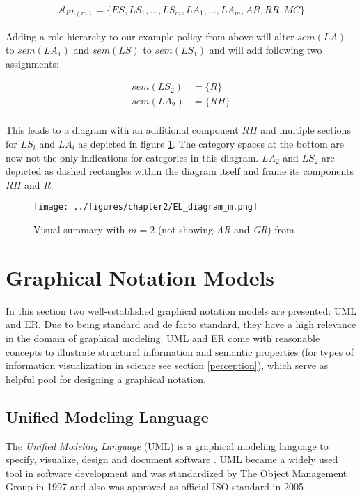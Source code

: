 \documentclass[twoside, openright, 12pt]{book}
\begin{document}
\begin{align*}
\mathcal{A}_{\mathit{EL}(m)} = \lbrace \mathit{ES}, \mathit{LS}_1, \dots, \mathit{LS}_m, \mathit{LA}_1, \dots, \mathit{LA}_m, \mathit{AR}, \mathit{RR}, \mathit{MC}\rbrace
\end{align*}

\noindent
Adding a role hierarchy to our example policy from above will alter $sem(\mathit{LA})$ to $sem(\mathit{LA}_1)$ and $sem(\mathit{LS})$ to $sem(\mathit{LS}_1)$ and will add following two assignments:

\begin{align*}
sem(\mathit{LS}_2) &= \lbrace R \rbrace\\
sem(\mathit{LA}_2) &= \lbrace \mathit{RH} \rbrace\\
\end{align*}

\noindent
This leads to a diagram with an additional component $RH$ and multiple sections for $\mathit{LS}_i$ and $\mathit{LA}_i$ as depicted in figure \ref{fig:EL_diagram_m}.
The category spaces at the bottom are now not the only indications for categories in this diagram.
$\mathit{LA}_2$ and $\mathit{LS}_2$ are depicted as dashed rectangles within the diagram itself and frame its components $\mathit{RH}$ and $R$.

\begin{figure}[htb]
	\centering
	\texttt{[image: ../figures/chapter2/EL\_diagram\_m.png]}
	\caption{Visual summary with $m=2$ (not showing \textit{AR} and \textit{GR}) from \cite[p.79, figure 4.4]{Amthor18}}
	\label{fig:EL_diagram_m}
\end{figure}



\section{Graphical Notation Models}
\label{graphical_notations}
In this section two well-established graphical notation models are presented: UML and ER.
Due to being standard and de facto standard, they have a high relevance in the domain of graphical modeling. 
UML and ER come with reasonable concepts to illustrate structural information and semantic properties (for types of information visualization in science see section \ref{perception}), which serve as helpful pool for designing a graphical notation.

\subsection{Unified Modeling Language}
\label{UML}
The \textit{Unified Modeling Language} (UML) is a graphical modeling language to specify, visualize, design and document software \citep{UML_OMG}.
UML became a widely used tool in software development and was standardized by The Object Management Group in 1997 and also was approved as official ISO standard in 2005 \citep{UML_ISO}.
\end{document}
